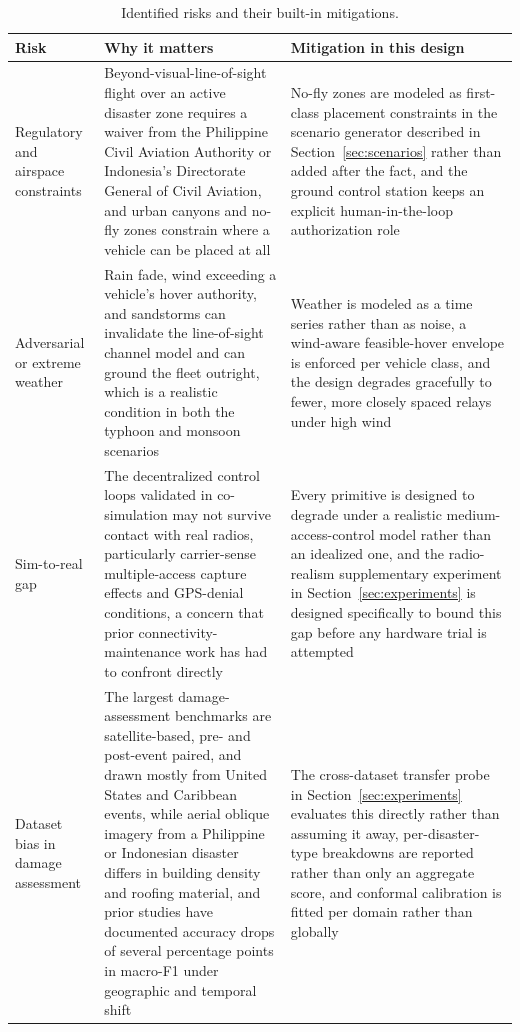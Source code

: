 \documentclass[drones,article,submit,moreauthors]{Definitions/mdpi}
\begin{document}
\begin{table}[H]
\caption{Identified risks and their built-in mitigations.}
\label{tab:risks}
\begin{tabular}{p{2.8cm}p{5.0cm}p{5.0cm}}
\toprule
\textbf{Risk} & \textbf{Why it matters} & \textbf{Mitigation in this design} \\
\midrule
Regulatory and airspace constraints & Beyond-visual-line-of-sight flight over an active disaster zone requires a waiver from the Philippine Civil Aviation Authority or Indonesia's Directorate General of Civil Aviation, and urban canyons and no-fly zones constrain where a vehicle can be placed at all & No-fly zones are modeled as first-class placement constraints in the scenario generator described in Section~\ref{sec:scenarios} rather than added after the fact, and the ground control station keeps an explicit human-in-the-loop authorization role \\
Adversarial or extreme weather & Rain fade, wind exceeding a vehicle's hover authority, and sandstorms can invalidate the line-of-sight channel model and can ground the fleet outright, which is a realistic condition in both the typhoon and monsoon scenarios & Weather is modeled as a time series rather than as noise, a wind-aware feasible-hover envelope is enforced per vehicle class, and the design degrades gracefully to fewer, more closely spaced relays under high wind \\
Sim-to-real gap & The decentralized control loops validated in co-simulation may not survive contact with real radios, particularly carrier-sense multiple-access capture effects and GPS-denial conditions, a concern that prior connectivity-maintenance work has had to confront directly \cite{li2023selfhealing,tardioli2024decentralized} & Every primitive is designed to degrade under a realistic medium-access-control model rather than an idealized one, and the radio-realism supplementary experiment in Section~\ref{sec:experiments} is designed specifically to bound this gap before any hardware trial is attempted \\
Dataset bias in damage assessment & The largest damage-assessment benchmarks are satellite-based, pre- and post-event paired, and drawn mostly from United States and Caribbean events, while aerial oblique imagery from a Philippine or Indonesian disaster differs in building density and roofing material, and prior studies have documented accuracy drops of several percentage points in macro-F1 under geographic and temporal shift & The cross-dataset transfer probe in Section~\ref{sec:experiments} evaluates this directly rather than assuming it away, per-disaster-type breakdowns are reported rather than only an aggregate score, and conformal calibration is fitted per domain rather than globally \\

\end{tabular}
\end{table}
\end{document}
